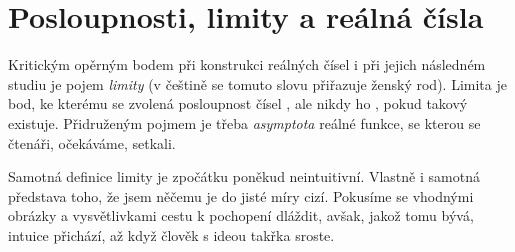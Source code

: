 \chapter{Posloupnosti, limity a reálná čísla}
\label{chap:posloupnosti-limity-a-realna-cisla}

Kritickým opěrným bodem při konstrukci reálných čísel i při jejich následném
studiu je pojem \emph{limity} (v češtině se tomuto slovu přiřazuje ženský rod).
Limita je bod, ke kterému se zvolená posloupnost čísel , ale nikdy ho
, pokud takový existuje. Přidruženým pojmem je třeba
\emph{asymptota} reálné funkce, se kterou se čtenáři, očekáváme, setkali.

Samotná definice limity je zpočátku poněkud neintuitivní. Vlastně i samotná
představa toho, že jsem něčemu  je do jisté míry cizí.
Pokusíme se vhodnými obrázky a vysvětlivkami cestu k pochopení dláždit, avšak,
jakož tomu bývá, intuice přichází, až když člověk s ideou takřka sroste.


